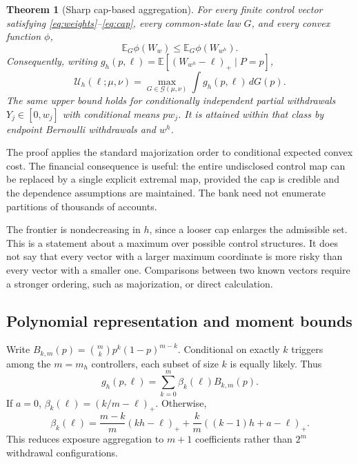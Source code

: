 \documentclass[11pt]{article}
\newtheorem{theorem}{Theorem}
\theoremstyle{definition}\newtheorem{definition}[theorem]{Definition}
\newcommand{\E}{\mathbb E}
\newcommand{\G}{\mathcal G}
\newcommand{\U}{\mathcal U}
\newcommand{\pos}[1]{\left(#1\right)_+}
\begin{document}
\begin{theorem}[Sharp cap-based aggregation]\label{thm:cap}
For every finite control vector satisfying \eqref{eq:weights}--\eqref{eq:cap}, every common-state law \(G\), and every convex function \(\phi\),
\begin{equation}
 \E_G\phi(W_w)\leq\E_G\phi(W_{w^h}).
 \label{eq:convexorder}
\end{equation}
Consequently, writing \(g_h(p,\ell)=\E[\pos{W_{w^h}-\ell}\mid P=p]\),
\begin{equation}
 \U_h(\ell;\mu,\nu)=\max_{G\in\G(\mu,\nu)}\int g_h(p,\ell)\,dG(p).
 \label{eq:reduction}
\end{equation}
The same upper bound holds for conditionally independent partial withdrawals \(Y_j\in[0,w_j]\) with conditional means \(pw_j\). It is attained within that class by endpoint Bernoulli withdrawals and \(w^h\).
\end{theorem}
The proof applies the standard majorization order to conditional expected convex cost. The financial consequence is useful: the entire undisclosed control map can be replaced by a single explicit extremal map, provided the cap is credible and the dependence assumptions are maintained. The bank need not enumerate partitions of thousands of accounts.

The frontier is nondecreasing in \(h\), since a looser cap enlarges the admissible set. This is a statement about a maximum over possible control structures. It does not say that every vector with a larger maximum coordinate is more risky than every vector with a smaller one. Comparisons between two known vectors require a stronger ordering, such as majorization, or direct calculation.

\subsection{Polynomial representation and moment bounds}
Write \(B_{k,m}(p)=\binom{m}{k}p^k(1-p)^{m-k}\). Conditional on exactly \(k\) triggers among the \(m=m_h\) controllers, each subset of size \(k\) is equally likely. Thus
\begin{equation}
 g_h(p,\ell)=\sum_{k=0}^{m}\beta_k(\ell)B_{k,m}(p).
 \label{eq:bernstein}
\end{equation}
If \(a=0\), \(\beta_k(\ell)=\pos{k/m-\ell}\). Otherwise,
\begin{equation}
 \beta_k(\ell)=\frac{m-k}{m}\pos{kh-\ell}
 +\frac{k}{m}\pos{(k-1)h+a-\ell}.
 \label{eq:beta}
\end{equation}
This reduces exposure aggregation to \(m+1\) coefficients rather than \(2^m\) withdrawal configurations.
\end{document}
